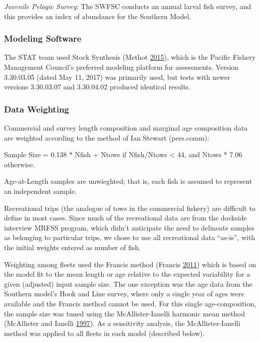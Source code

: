 \documentclass[12pt,]{article}
\begin{document}
\emph{Juvenile Pelagic Survey}: The SWFSC conducts an annual larval fish
survey, and this provides an index of abundance for the Southern Model.

\subsubsection{Modeling Software}\label{modeling-software}

The STAT team used Stock Synthesis (Methot
\protect\hyperlink{ref-Methot2015}{2015}), which is the Pacific Fishery
Management Council's preferred modeling platform for assessments.
Version 3.30.03.05 (dated May 11, 2017) was primarily used, but tests
with newer versions 3.30.03.07 and 3.30.04.02 produced identical
results.

\subsubsection{Data Weighting}\label{data-weighting}

Commercial and survey length composition and marginal age composition
data are weighted according to the method of Ian Stewart (pers.comm):

Sample Size = 0.138 * Nfish + Ntows if Nfish/Ntows \textless{} 44, and
Ntows * 7.06 otherwise.

Age-at-Length samples are unwieghted; that is, each fish is assumed to
represent an independent sample.

Recreational trips (the analogue of tows in the commercial fishery) are
difficult to define in most cases. Since much of the recreational data
are from the dockside interview MRFSS program, which didn't anticipate
the need to delineate samples as belonging to particular trips, we chose
to use all recreational data ``as-is'', with the initial weights entered
as number of fish.

Weighting among fleets used the Francis method (Francis
\protect\hyperlink{ref-Francis2011}{2011}) which is based on the model
fit to the mean length or age relative to the expected variability for a
given (adjusted) input sample size. The one exception was the age data
from the Southern model's Hook and Line survey, where only a single year
of ages were available and the Francis method cannot be used. For this
single age-composition, the sample size was tuned using the
McAllister-Ianelli harmonic mean method (McAllister and Ianelli
\protect\hyperlink{ref-McAllister1997}{1997}). As a sensitivity
analysis, the McAllister-Ianelli method was applied to all fleets in
each model (described below).
\end{document}
